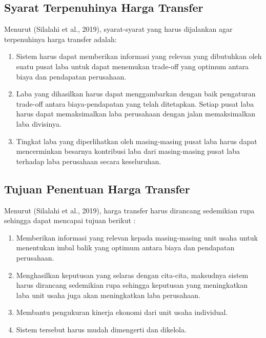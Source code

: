 \begin{spacing}{1.5}
\subsection{Syarat Terpenuhinya Harga Transfer}

Menurut (Silalahi et al., 2019), syarat-syarat yang harus dijalankan agar terpenuhinya harga transfer adalah:

\begin{enumerate}
	\item Sistem harus dapat memberikan informasi yang relevan yang dibutuhkan oleh suatu pusat laba untuk dapat menemukan trade-off yang optimum antara biaya dan pendapatan perusahaan.
	\item Laba yang dihasilkan harus dapat menggambarkan dengan baik pengaturan trade-off antara biaya-pendapatan yang telah ditetapkan. Setiap pusat laba harus dapat memaksimalkan laba perusahaan dengan jalan memaksimalkan laba divisinya.
	\item Tingkat laba yang diperlihatkan oleh masing-masing pusat laba harus dapat mencerminkan besarnya kontribusi laba dari masing-masing pusat laba terhadap laba perusahaan secara keseluruhan.	
\end{enumerate}

\subsection{Tujuan Penentuan Harga Transfer}

Menurut (Silalahi et al., 2019), harga transfer harus dirancang sedemikian rupa sehingga dapat mencapai tujuan berikut :

\begin{enumerate}
	\item Memberikan informasi yang relevan kepada masing-masing unit usaha untuk menentukan imbal balik yang optimum antara biaya dan pendapatan perusahaan.
	\item Menghasilkan keputusan yang selaras dengan cita-cita, maksudnya sistem harus dirancang sedemikian rupa sehingga keputusan yang meningkatkan laba unit usaha juga akan meningkatkan laba perusahaan.
	\item Membantu pengukuran kinerja ekonomi dari unit usaha individual.
	\item Sistem tersebut harus mudah dimengerti dan dikelola.
\end{enumerate}


\end{spacing}
